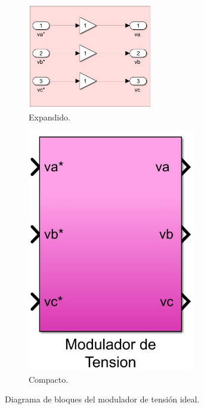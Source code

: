 \documentclass{article}
\begin{document}
\begin{enumerate}[label=\roman*.]
    \begin{figure}[H]
        \begin{subfigure}[b]{0.7\textwidth}
            \centering
            \includegraphics[width=0.6\textwidth]{modulador_tension.jpg}
            \caption{Expandido.}
        \end{subfigure}
        \begin{subfigure}[b]{0.3\textwidth}
            \centering
            \includegraphics[width=0.8\textwidth]{modulador_tension_compacto.jpg}
            \caption{Compacto.}
        \end{subfigure}
        \caption{Diagrama de bloques del modulador de tensión ideal.}
    \end{figure}


\end{enumerate}
\end{document}
